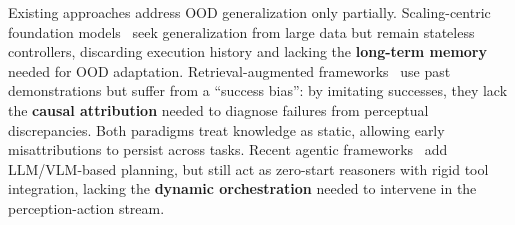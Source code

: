 

Existing approaches address OOD generalization only partially.
Scaling-centric foundation models~\cite{pi0, openvla, openx} seek generalization from large data but remain stateless controllers, discarding execution history and lacking the \textbf{long-term memory} needed for OOD adaptation.
Retrieval-augmented frameworks~\cite{ricl, memer} use past demonstrations but suffer from a ``success bias'': by imitating successes, they lack the \textbf{causal attribution} needed to diagnose failures from perceptual discrepancies.
Both paradigms treat knowledge as static, allowing early misattributions to persist across tasks.
Recent agentic frameworks~\cite{cap, voxposer, moka} add {\color{black}LLM/VLM-based planning}, but still act as zero-start reasoners with rigid tool integration, lacking the \textbf{dynamic orchestration} needed to intervene in the perception-action stream.


